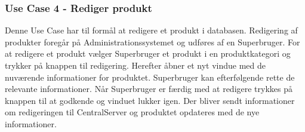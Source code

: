 \subsubsection{Use Case 4 - Rediger produkt}
Denne Use Case har til formål at redigere et produkt i databasen. Redigering af produkter foregår på Administrationssystemet og udføres af en Superbruger. For at redigere et produkt vælger Superbruger et produkt i en produktkategori og trykker på knappen til redigering. Herefter åbner et nyt vindue med de nuværende informationer for produktet. Superbruger kan efterfølgende rette de relevante informationer. Når Superbruger er færdig med at redigere trykkes på knappen til at godkende og vinduet lukker igen. Der bliver sendt informationer om redigeringen til CentralServer og produktet opdateres med de nye informationer.